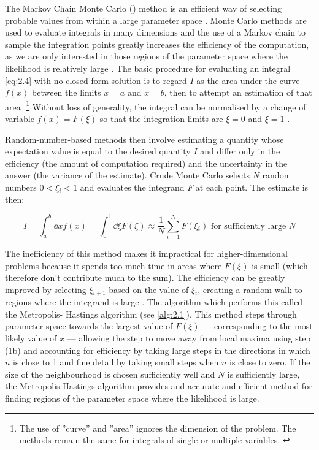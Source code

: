 The Markov Chain Monte Carlo (\mcmc{}) method is an efficient way of selecting probable values from within a large parameter space \cite{LewisBridle2002}. Monte Carlo methods are used to evaluate integrals in many dimensions and the use of a Markov chain to sample the integration points greatly increases the efficiency of the computation, as we are only interested in those regions of the parameter space where the likelihood is relatively large \cite{Gregory2005}. The basic procedure for evaluating an integral \cref{eq:2.4} with no closed-form solution is to regard $I$ as the area under the curve $f(x)$ between the limits $x = a$ and $x = b$, then to attempt an estimation of that area \cite{Riley2002}.\footnote{The use of ”curve” and ”area” ignores the dimension of the problem. The methods remain the same for integrals of single or multiple variables. \cite{Riley2002}} Without loss of generality, the integral can be normalised by a change of variable $f(x) = F(\xi{})$ so that the integration limits are $\xi{} = 0$ and $\xi{} = 1$ \cite{Riley2002}.

Random-number-based methods then involve estimating a quantity whose expectation value is equal to the desired quantity $I$ and differ only in the efficiency (the amount of computation required) and the uncertainty in the answer (the variance of the estimate). Crude Monte Carlo selects $N$ random numbers $0 < \xi{}_i < 1$ and evaluates the integrand $F$ at each point. The estimate is then:

\begin{equation}
    I
    = \int_{a}^{b} \dd{x} f(x)
    = \int_{0}^{1} \dd{\xi} F(\xi)
    \approx{} \frac{1}{N} \sum_{i=1}^{N} F \left( \xi{}_{i} \right)
    \text{ for sufficiently large }N
\label{eq:2.4}
\end{equation}

The inefficiency of this method makes it impractical for higher-dimensional problems \cite{Riley2002} because it spends too much time in areas where $F(\xi{})$ is small (which therefore don’t contribute much to the sum). The efficiency can be greatly improved by selecting $\xi{}_{i+1}$ based on the value of $\xi{}_i$, creating a random walk to regions where the integrand is large \cite{Gregory2005}. The algorithm which performs this called the Metropolis- Hastings algorithm  (see \cref{alg:2.1}). This method steps through parameter space towards the largest value of $F(\xi{})$ --- corresponding to the most likely value of $x$ --- allowing the step to move away from local maxima using step (1b) and accounting for efficiency by taking large steps in the directions in which $n$ is close to 1 and fine detail by taking small steps when $n$ is close to zero. If the size of the neighbourhood is chosen sufficiently well and $N$ is sufficiently large, the Metropolis-Hastings algorithm provides and accurate and efficient method for finding regions of the parameter space where the likelihood is large.

